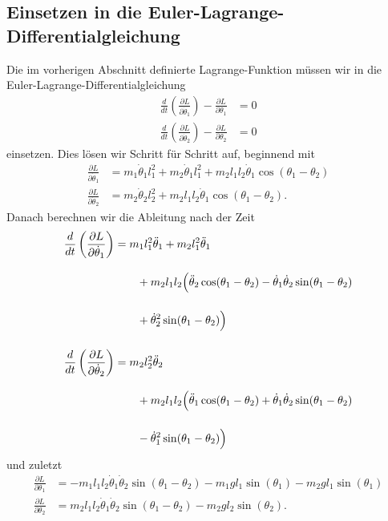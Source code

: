\subsection{Einsetzen in die Euler-Lagrange-Differentialgleichung}
Die im vorherigen Abschnitt definierte Lagrange-Funktion müssen wir in
die Euler-Lagrange-Differentialgleichung
\begin{align}
    \label{eq:lag1}
    \frac{d}{dt} \left(\frac{\partial L}{\partial \dot{\theta}_1}\right) 
    - \frac{\partial L}{\partial \theta_1} &= 0\\
    \label{eq:lag2}
    \frac{d}{dt} \left(\frac{\partial L}{\partial \dot{\theta}_2}\right) 
    - \frac{\partial L}{\partial \theta_2} &= 0
\end{align}
einsetzen.
Dies lösen wir Schritt für Schritt auf, beginnend mit
\begin{align*}
    \frac{\partial L}{\partial \dot{\theta}_1} &= m_1 \dot{\theta}_1 l_1^2
    + m_2 \dot{\theta}_1 l_1^2 + m_2 l_1 l_2 \dot{\theta}_1
    \cos(\theta_1-\theta_2)\\
    \frac{\partial L}{\partial \dot{\theta}_2} &= m_2 \dot{\theta}_2 l_2^2
    + m_2 l_1 l_2 \dot{\theta}_1 \cos(\theta_1-\theta_2).
\end{align*}
Danach berechnen wir die Ableitung nach der Zeit
\begin{align*}
    \frac{d}{dt} \left(\frac{\partial L}{\partial \dot{\theta}_1}\right) &=
    m_1 l_1^2 \ddot{\theta}_1 + m_2 l_1^2 \ddot{\theta}_1\\
    \shortintertext{}
    & \qquad + m_2 l_1 l_2 \Bigl(\ddot{\theta}_2\cos(\theta_1-\theta_2)-
    \dot{\theta}_1 \dot{\theta}_2 \sin(\theta_1-\theta_2) \nonumber\\
    \shortintertext{}
    & \qquad + \dot{\theta}_2^2 \sin(\theta_1-\theta_2)\Bigr)
    \nonumber\\
    \shortintertext{}
    \frac{d}{dt} \left(\frac{\partial L}{\partial \dot{\theta}_2}\right) &=
    m_2 l_2^2 \ddot{\theta}_2\\
    \shortintertext{}
    & \qquad + m_2 l_1 l_2 \Bigl(\ddot{\theta}_1\cos(\theta_1-\theta_2)+
    \dot{\theta}_1 \dot{\theta}_2 \sin(\theta_1-\theta_2) \nonumber\\
    \shortintertext{}
    & \qquad - \dot{\theta}_1^2 \sin(\theta_1-\theta_2)\Bigr)
    \nonumber
\end{align*}
und zuletzt
\begin{align*}
    \frac{\partial L}{\partial {\theta}_1} &= -m_1 l_1 l_2 \dot{\theta}_1
    \dot{\theta}_2 \sin(\theta_1-\theta_2) - m_1 g l_1 \sin(\theta_1)
    - m_2 g l_1 \sin(\theta_1)\\
    \frac{\partial L}{\partial {\theta}_2} &= m_2 l_1 l_2 \dot{\theta}_1
    \dot{\theta}_2 \sin(\theta_1-\theta_2) - m_2 g l_2 \sin(\theta_2).
\end{align*}
